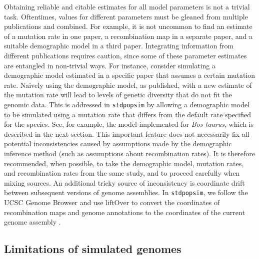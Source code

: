 \documentclass[hidelinks]{article}
\newcommand{\stdpopsim}{\texttt{stdpopsim}\xspace}
\begin{document}
Obtaining reliable and citable estimates for all model parameters is not a trivial task.
Oftentimes, values for different parameters must be gleaned from multiple publications and combined.
For example, it is not uncommon to find an estimate of a mutation rate in one paper,
a recombination map in a separate paper, and a suitable demographic model in a third paper.
Integrating information from different publications requires caution,
since some of these parameter estimates are entangled in non-trivial ways.
For instance, consider simulating a demographic model estimated in a specific paper that assumes
a certain mutation rate.
Naively using the demographic model, as published, with a new estimate of the mutation rate
will lead to levels of genetic diversity that do not fit the genomic data.
This is addressed in \stdpopsim by allowing a demographic model to be simulated using a mutation rate that differs from the default rate specified for the species.
See, for example, the model implemented for \emph{Bos taurus},
which is described in the next section.
This important feature does not necessarily fix all potential inconsistencies
caused by assumptions made by the demographic inference method
(such as assumptions about recombination rates).
It is therefore recommended, when possible, to take the demographic model,
mutation rates, and recombination rates from the same study,
and to proceed carefully when mixing sources.
An additional tricky source of inconsistency is coordinate drift between 
subsequent versions of genome assemblies.
In \stdpopsim, we follow the UCSC Genome Browser
and use liftOver to convert the coordinates of recombination maps and genome annotations
to the coordinates of the current genome assembly \citep{Hinrichs2006ucsc}.

\subsection*{Limitations of simulated genomes}
\end{document}
